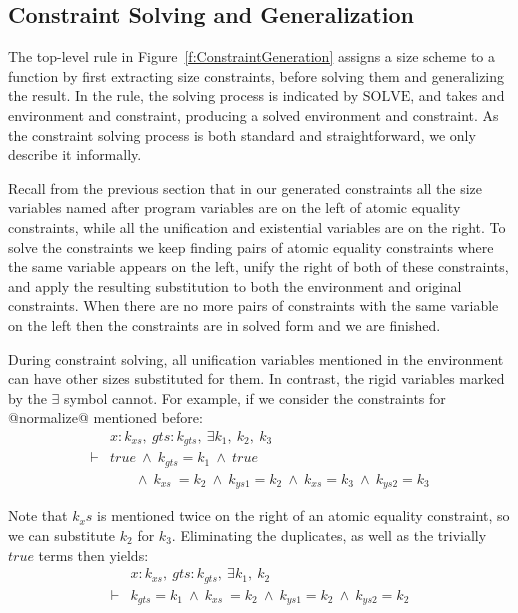 \subsection{Constraint Solving and Generalization}
The top-level rule in Figure~\ref{f:ConstraintGeneration} assigns a size scheme to a function by first extracting size constraints, before solving them and generalizing the result. In the rule, the solving process is indicated by $\textrm{SOLVE}$, and takes and environment and constraint, producing a solved environment and constraint. As the constraint solving process is both standard and straightforward, we only describe it informally.

Recall from the previous section that in our generated constraints all the size variables named after program variables are on the left of atomic equality constraints, while all the unification and existential variables are on the right. To solve the constraints we keep finding pairs of atomic equality constraints where the same variable appears on the left, unify the right of both of these constraints, and apply the resulting substitution to both the environment and original constraints. When there are no more pairs of constraints with the same variable on the left then the constraints are in solved form and we are finished.

During constraint solving, all unification variables mentioned in the environment can have other sizes substituted for them. In contrast, the rigid variables marked by the $\exists$ symbol cannot. For example, if we consider the constraints for @normalize@ mentioned before:
$$
\begin{array}{ll}
       & x : k_{xs},~ gts : k_{gts},~ \exists k_1,~ k_2,~ k_3 
\\
\vdash & true 
        ~\wedge~  k_{gts} = k_1
        ~\wedge~  true
\\     &~~~~~~~~ 
          \wedge~  k_{xs}  ~= k_2
        ~ \wedge~  k_{ys1}  = k_2 
        ~ \wedge~  k_{xs}   = k_3
        ~ \wedge~  k_{ys2}  = k_3
\end{array}
$$

Note that $k_xs$ is mentioned twice on the right of an atomic equality constraint, so we can substitute $k_2$ for $k_3$. Eliminating the duplicates, as well as the trivially $true$ terms then yields:
$$
\begin{array}{ll}
       & x : k_{xs},~ gts : k_{gts},~ \exists k_1,~ k_2 
\\
\vdash & k_{gts} = k_1
        ~\wedge~  k_{xs}  ~= k_2
        ~\wedge~  k_{ys1}  = k_2 
        ~\wedge~  k_{ys2}  = k_2
\end{array}
$$

